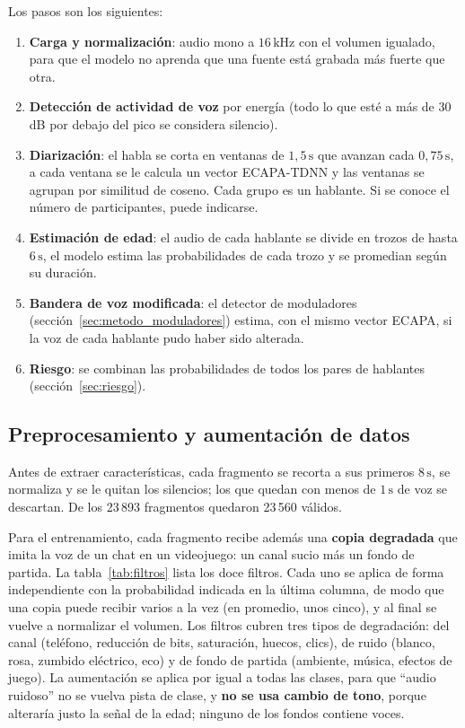 \documentclass[11pt,a4paper]{article}
\begin{document}
Los pasos son los siguientes:
\begin{enumerate}
  \item \textbf{Carga y normalización}: audio mono a $16\,\mathrm{kHz}$ con el volumen igualado, para que el modelo no aprenda que una fuente está grabada más fuerte que otra.
  \item \textbf{Detección de actividad de voz} por energía (todo lo que esté a más de 30\,dB por debajo del pico se considera silencio).
  \item \textbf{Diarización}: el habla se corta en ventanas de $1{,}5\,\mathrm{s}$ que avanzan cada $0{,}75\,\mathrm{s}$, a cada ventana se le calcula un vector ECAPA-TDNN y las ventanas se agrupan por similitud de coseno. Cada grupo es un hablante. Si se conoce el número de participantes, puede indicarse.
  \item \textbf{Estimación de edad}: el audio de cada hablante se divide en trozos de hasta $6\,\mathrm{s}$, el modelo estima las probabilidades de cada trozo y se promedian según su duración.
  \item \textbf{Bandera de voz modificada}: el detector de moduladores (sección~\ref{sec:metodo_moduladores}) estima, con el mismo vector ECAPA, si la voz de cada hablante pudo haber sido alterada.
  \item \textbf{Riesgo}: se combinan las probabilidades de todos los pares de hablantes (sección~\ref{sec:riesgo}).
\end{enumerate}

\subsection{Preprocesamiento y aumentación de datos}
\label{sec:filtros}

Antes de extraer características, cada fragmento se recorta a sus primeros $8\,\mathrm{s}$, se normaliza y se le quitan los silencios; los que quedan con menos de $1\,\mathrm{s}$ de voz se descartan. De los 23\,893 fragmentos quedaron 23\,560 válidos.

Para el entrenamiento, cada fragmento recibe además una \textbf{copia degradada} que imita la voz de un chat en un videojuego: un canal sucio más un fondo de partida. La tabla~\ref{tab:filtros} lista los doce filtros. Cada uno se aplica de forma independiente con la probabilidad indicada en la última columna, de modo que una copia puede recibir varios a la vez (en promedio, unos cinco), y al final se vuelve a normalizar el volumen. Los filtros cubren tres tipos de degradación: del canal (teléfono, reducción de bits, saturación, huecos, clics), de ruido (blanco, rosa, zumbido eléctrico, eco) y de fondo de partida (ambiente, música, efectos de juego). La aumentación se aplica por igual a todas las clases, para que ``audio ruidoso'' no se vuelva pista de clase, y \textbf{no se usa cambio de tono}, porque alteraría justo la señal de la edad; ninguno de los fondos contiene voces.
\end{document}
